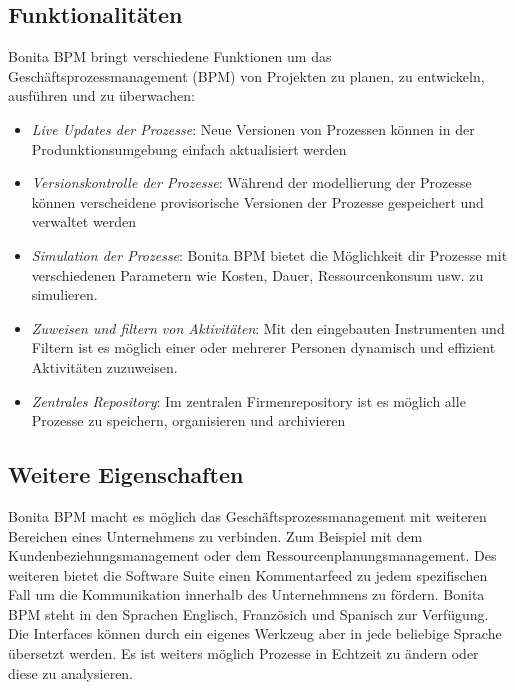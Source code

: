 \subsection{Funktionalit\"aten}
Bonita BPM bringt verschiedene Funktionen um das Gesch\"aftsprozessmanagement (BPM) von Projekten zu planen, zu entwickeln, ausf\"uhren und zu \"uberwachen:
\begin{itemize}
 \item{\textit{Live Updates der Prozesse}: Neue Versionen von Prozessen k\"onnen in der Produnktionsumgebung einfach aktualisiert werden}
 \item{\textit{Versionskontrolle der Prozesse}: W\"ahrend der modellierung der Prozesse k\"onnen verscheidene provisorische Versionen der Prozesse gespeichert und verwaltet werden}
 \item{\textit{Simulation der Prozesse}: Bonita BPM bietet die M\"oglichkeit dir Prozesse mit verschiedenen Parametern wie Kosten, Dauer, Ressourcenkonsum usw. zu simulieren.}
\item{\textit{Zuweisen und filtern von Aktivit\"aten}: Mit den eingebauten Instrumenten und Filtern ist es m\"oglich einer oder mehrerer Personen dynamisch und effizient Aktivit\"aten zuzuweisen.}
\item{\textit{Zentrales Repository}: Im zentralen Firmenrepository ist es m\"oglich alle Prozesse zu speichern, organisieren und archivieren}
\end{itemize}
\subsection{Weitere Eigenschaften}
Bonita BPM macht es m\"oglich das Gesch\"aftsprozessmanagement mit weiteren Bereichen eines Unternehmens zu verbinden. Zum Beispiel mit dem Kundenbeziehungsmanagement oder dem Ressourcenplanungsmanagement. Des weiteren bietet die Software Suite einen Kommentarfeed zu jedem spezifischen Fall um die Kommunikation innerhalb des Unternehmnens zu f\"ordern. Bonita BPM steht in den Sprachen Englisch, Franz\"osich und Spanisch zur Verf\"ugung. Die Interfaces k\"onnen durch ein eigenes Werkzeug aber in jede beliebige Sprache \"ubersetzt werden. Es ist weiters m\"oglich Prozesse in Echtzeit zu \"andern oder diese zu analysieren.